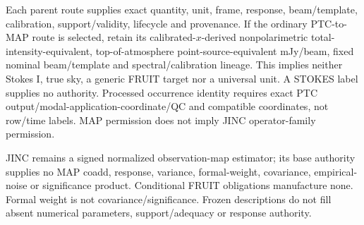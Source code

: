 {{Each parent route supplies exact quantity, unit, frame, response, beam/template,
calibration, support/validity, lifecycle and provenance. If the ordinary
PTC-to-MAP route is selected, retain its calibrated-$x$-derived nonpolarimetric
total-intensity-equivalent, top-of-atmosphere point-source-equivalent mJy/beam,
fixed nominal beam/template and spectral/calibration lineage. This implies
neither Stokes I, true sky, a generic FRUIT target nor a universal unit.
A STOKES label supplies no authority. Processed occurrence identity requires
exact PTC output/modal-application-coordinate/QC and compatible coordinates, not row/time labels.
MAP permission does not imply JINC operator-family permission.

JINC remains a signed normalized observation-map estimator; its base authority
supplies no MAP coadd, response, variance, formal-weight, covariance, empirical-
noise or significance product. Conditional FRUIT obligations manufacture none.
Formal weight is not covariance/significance. Frozen descriptions do not fill
absent numerical parameters, support/adequacy or response authority.
}}
